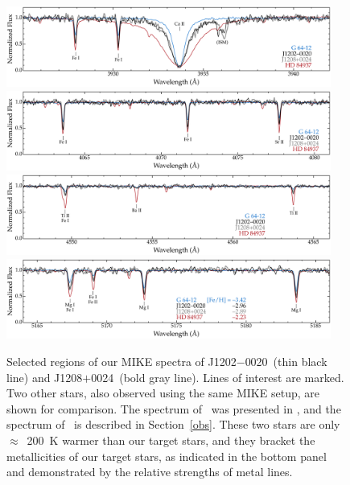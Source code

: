 \documentclass[twocolumn,tighten]{aastex62}
\newcommand{\gsix}{\object[G 64-12]{G~64-12}}
\newcommand{\hdeight}{\object[HD 84937]{HD~84937}}
\newcommand{\jtwo}{J1202$-$0020}
\newcommand{\jeight}{J1208$+$0024}
\begin{document}
\begin{figure}
\begin{center}
\includegraphics[angle=0,width=0.95\textwidth]{fig1a.pdf} \\
\includegraphics[angle=0,width=0.95\textwidth]{fig1b.pdf} \\
\includegraphics[angle=0,width=0.95\textwidth]{fig1c.pdf} \\
\includegraphics[angle=0,width=0.95\textwidth]{fig1d.pdf} 
\end{center}
\vspace{-4mm}
\caption{
\label{specplot}
Selected regions of our MIKE spectra of \jtwo\ (thin black line)
and \jeight\ (bold gray line).
Lines of interest are marked.
Two other stars, also observed using the same MIKE setup,
are shown for comparison.
The spectrum of \gsix\ was presented in \citet{roederer14c},
and the spectrum of \hdeight\ is described in Section~\ref{obs}.
These two stars are only $\approx$~200~K warmer
than our target stars, and they
bracket the metallicities of our target stars,
as indicated in the bottom panel
and demonstrated by the relative strengths of 
metal lines.
 }
\end{figure}
\end{document}
